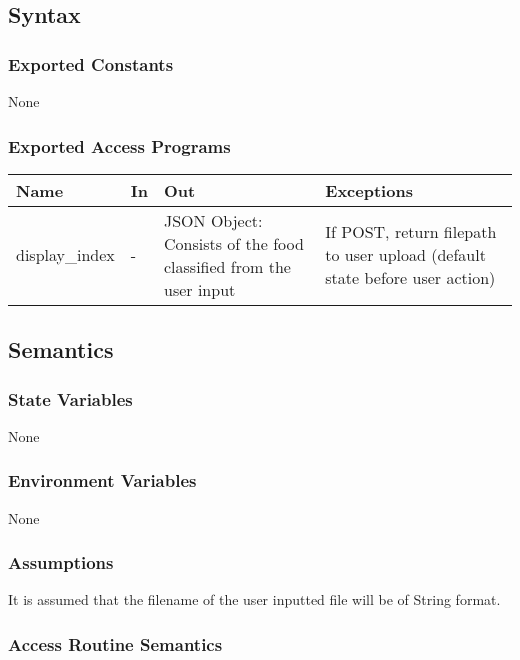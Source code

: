 \documentclass[12pt, titlepage]{article}
\begin{document}
\subsection{Syntax}

\subsubsection{Exported Constants}

None

\subsubsection{Exported Access Programs}

\begin{center}
\begin{tabular}{p{2.5cm} p{0.5cm} p{4.5cm} p{5cm}}
\hline
\textbf{Name} & \textbf{In} & \textbf{Out} & \textbf{Exceptions} \\
\hline
display\_index & - & JSON Object: Consists of the food classified from the user input & If POST, return filepath to user upload (default state before user action) \\
\hline
\end{tabular}
\end{center}

\subsection{Semantics}

\subsubsection{State Variables}

None

\subsubsection{Environment Variables}

None

\subsubsection{Assumptions}

It is assumed that the filename of the user inputted file will be of String format.

\subsubsection{Access Routine Semantics}
\end{document}
